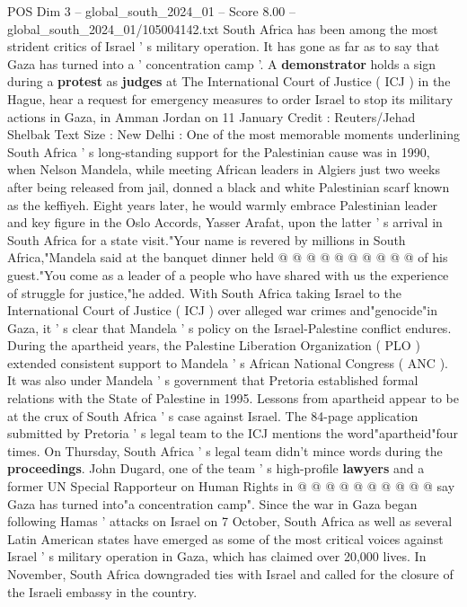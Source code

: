 \begin{textsample}{POS Dim 3 – global\_south\_2024\_01 – Score 8.00 – global\_south\_2024\_01/105004142.txt}  \label{ex:f3_pos_350}
South Africa has been among the most strident critics of Israel ' s military operation.
It has gone as far as to say that Gaza has turned into a ' concentration camp '.
A \textbf{demonstrator} holds a sign during a \textbf{protest} as \textbf{judges} at The International Court of Justice ( ICJ ) in the Hague, hear a request for emergency measures to order Israel to stop its military actions in Gaza, in Amman Jordan on 11 January Credit : Reuters/Jehad Shelbak Text Size : New Delhi : One of the most memorable moments underlining South Africa ' s long-standing support for the Palestinian cause was in 1990, when Nelson Mandela, while meeting African leaders in Algiers just two weeks after being released from jail, donned a black and white Palestinian scarf known as the keffiyeh.
Eight years later, he would warmly embrace Palestinian leader and key figure in the Oslo Accords, Yasser Arafat, upon the latter ' s arrival in South Africa for a state visit."Your name is revered by millions in South Africa,"Mandela said at the banquet dinner held @ @ @ @ @ @ @ @ @ @ of his guest."You come as a leader of a people who have shared with us the experience of struggle for justice,"he added.
With South Africa taking Israel to the International Court of Justice ( ICJ ) over alleged war crimes and"genocide"in Gaza, it ' s clear that Mandela ' s policy on the Israel-Palestine conflict endures.
During the apartheid years, the Palestine Liberation Organization ( PLO ) extended consistent support to Mandela ' s African National Congress ( ANC ).
It was also under Mandela ' s government that Pretoria established formal relations with the State of Palestine in 1995.
Lessons from apartheid appear to be at the crux of South Africa ' s case against Israel.
The 84-page application submitted by Pretoria ' s legal team to the ICJ mentions the word"apartheid"four times.
On Thursday, South Africa ' s legal team didn't mince words during the \textbf{proceedings}.
John Dugard, one of the team ' s high-profile \textbf{lawyers} and a former UN Special Rapporteur on Human Rights in @ @ @ @ @ @ @ @ @ @ say Gaza has turned into"a concentration camp".
Since the war in Gaza began following Hamas ' attacks on Israel on 7 October, South Africa as well as several Latin American states have emerged as some of the most critical voices against Israel ' s military operation in Gaza, which has claimed over 20,000 lives.
In November, South Africa downgraded ties with Israel and called for the closure of the Israeli embassy in the country.

\end{textsample}
